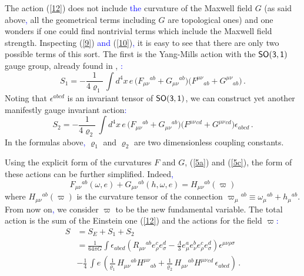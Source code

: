 \documentclass[prd,reprint,eqsecnum,nofootinbib]{revtex4-1}
\begin{document}
The action (\ref{12}) does not include \textcolor{blue}{the} curvature of the Maxwell
field $G$ (as said above\textcolor{blue}{,} all the geometrical terms including $G$ are
topological ones) and one wonders if one could find nontrivial
terms which include the Maxwell field strength. Inspecting
(\ref{9}) \textcolor{blue}{and} (\ref{10})\textcolor{blue}{,} it is easy to see that there are only two
possible terms of this sort. The first is the Yang-Mills action with
the $\sf{SO(3,1)}$ gauge group, already found in
\cite{Soroka:2011tc}, \cite{Durka:2011nf}\textcolor{blue}{:}
\begin{equation}\label{13}
 S_{1}= -  \frac1{4\varrho_1}\,\int d^4x\, e\, \big( F_{\mu\nu}{}^{ab} + G_{\mu\nu}{}^{ab}\big) \big( F^{\mu\nu}{}_{ab} +
    G^{\mu\nu}{}_{ab}\big)\, .
\end{equation}
Noting that $\epsilon^{abcd}$ is an invariant tensor of
$\sf{SO(3,1)}$, we can construct yet another manifestly gauge
invariant action\textcolor{blue}{:}
\begin{equation}\label{13a}
 S_{2}= -  \frac1{4\varrho_2}\,\int d^4x\, e\, \big( F_{\mu\nu}{}^{ab} + G_{\mu\nu}{}^{ab}\big) \big( F^{\mu\nu}{}^{cd} +
    G^{\mu\nu}{}^{cd}\big) \epsilon_{abcd}\, .
\end{equation}
In the formulas above\textcolor{blue}{,} $\varrho_1$ and $\varrho_2$ are two
dimensionless coupling constants.

Using the explicit form of the curvatures $F$ and $G$, (\ref{5a})
and (\ref{5c}), the form of these actions can be further simplified.
Indeed\textcolor{blue}{,}
$$
F_{\mu\nu}{}^{ab}(\omega, e) + G_{\mu\nu}{}^{ab}(h,\omega,e) =
H_{\mu\nu}{}^{ab}(\varpi)
$$
where $H_{\mu\nu}{}^{ab}(\varpi)$ is the curvature tensor of the
connection $\varpi_{\mu}{}^{ab}\equiv
\omega_{\mu}{}^{ab}+h_{\mu}{}^{ab}$. From now on\textcolor{blue}{,} we consider
$\varpi$ to be the new fundamental variable. The total action is the
sum of the Einstein one (\ref{12}) and the actions for the field
$\varpi$\textcolor{blue}{:}
\begin{align}
S &= S_E + S_1 +S_2 \nonumber\\
&=\frac{1}{64\pi
G}\int\epsilon_{abcd}\left(R_{\mu\nu}{}^{ab}e_{\rho}^{c}e_{\sigma}^{d}
-\frac{\Lambda}{3}e_{\mu}^{a}e_{\nu}^{b}e_{\rho}^{ c}e_{\sigma}^{
d}\right)\epsilon^{\mu\nu\rho\sigma}\nonumber\\
&-\frac14\,\int  e\, \left(\frac1{\varrho_1}\, H_{\mu\nu}{}^{ab}
H^{\mu\nu}{}_{ab}+ \frac1{\varrho_2}\,H_{\mu\nu}{}^{ab}
H^{\mu\nu}{}^{cd}\,\epsilon_{abcd}\right)\, .\label{14}
\end{align}
\end{document}
